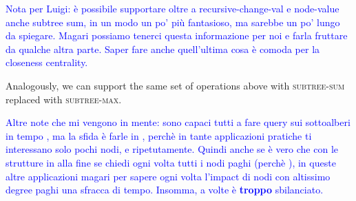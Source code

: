 \documentclass[a4paper,USenglish]{lipics}
\begin{document}
			\textcolor{blue}{Nota per Luigi: è possibile supportare oltre a recursive-change-val e node-value anche subtree sum, in un modo un po' più fantasioso, ma sarebbe un po' lungo da spiegare. Magari possiamo tenerci questa informazione per noi e farla fruttare da qualche altra parte. Saper fare anche quell'ultima cosa è comoda per la closeness centrality.}
			
			Analogously, we can support the same set of operations above with \textsc{subtree-sum} replaced with \textsc{subtree-max}.
			
			\textcolor{blue}{Altre note che mi vengono in mente: sono capaci tutti a fare query sui sottoalberi in tempo , ma la sfida è farle in , perchè in tante applicazioni pratiche ti interessano solo pochi nodi, e ripetutamente. Quindi anche se è vero che con le strutture in  alla fine se chiedi ogni volta tutti i nodi paghi  (perchè ), in queste altre applicazioni magari per sapere ogni volta l'impact di nodi con altissimo degree paghi una sfracca di tempo. Insomma,  a volte è \textbf{troppo} sbilanciato.}

\fi 
\end{document}
